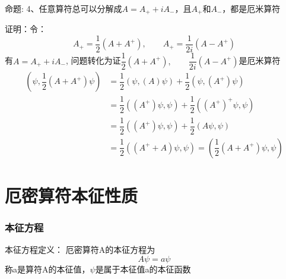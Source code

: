 \begin{frame} [allowframebreaks=]
    \frametitle{}
    \begin{tcolorbox1}{命题:}
       4、任意算符总可以分解成$A=A_+ +iA_-$，且$A_+$和$A_-$，都是厄米算符
    \end{tcolorbox1}
    \alert{证明：}令：
    $$A_+=\dfrac{1}{2} (A+A^+), \qquad A_+=\dfrac{1}{2i} (A-A^+) $$
    有$A=A_+ +iA_-$, 问题转化为证$\dfrac{1}{2} (A+A^+), \qquad \dfrac{1}{2i} (A-A^+) $是厄米算符\\
    \begin{equation*}
        \begin{split}
            (\psi, \dfrac{1}{2} (A+A^+)\psi ) &=\dfrac{1}{2}(\psi, (A)\psi) + \dfrac{1}{2}(\psi, (A^+)\psi) \\
            &= \dfrac{1}{2}((A^+)\psi, \psi) + \dfrac{1}{2}((A^+)^+\psi, \psi) \\
            &= \dfrac{1}{2}((A^+)\psi, \psi) + \dfrac{1}{2}(A\psi, \psi) \\
            &= \dfrac{1}{2}( (A^+ + A) \psi, \psi ) =( \dfrac{1}{2}(A+A^+) \psi, \psi ) 
         \end{split}
    \end{equation*}  
\end{frame} 

\section{厄密算符本征性质}

\begin{frame}
    \frametitle{本征方程}
    \begin{tcolorbox1}{本征方程定义：}
        厄密算符A的本征方程为
        $$ A\psi=a \psi $$
        称a是算符A的本征值，$\psi$是属于本征值a的本征函数
     \end{tcolorbox1}   
\end{frame} 

